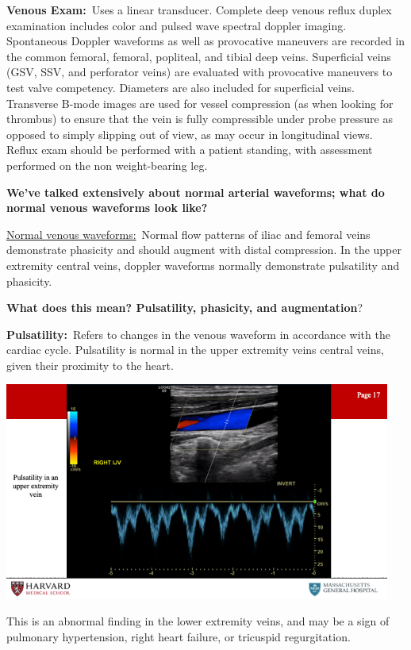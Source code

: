 \documentclass[
]{book}
\begin{document}
\textbf{Venous Exam:}~Uses a linear transducer. Complete deep venous reflux
duplex examination includes color and pulsed wave spectral doppler
imaging. Spontaneous Doppler waveforms as well as provocative maneuvers
are recorded in the common femoral, femoral, popliteal, and tibial deep
veins. Superficial veins (GSV, SSV, and perforator veins) are evaluated
with provocative maneuvers to test valve competency. Diameters are also
included for superficial veins. Transverse B-mode images are used for
vessel compression (as when looking for thrombus) to ensure that the
vein is fully compressible under probe pressure as opposed to simply
slipping out of view, as may occur in longitudinal views. Reflux exam
should be performed with a patient standing, with assessment performed
on the non weight-bearing leg.

\textbf{We've talked extensively about normal arterial waveforms; what do
normal venous waveforms look like?}

\underline{Normal venous waveforms:}~Normal flow patterns of iliac and
femoral veins demonstrate phasicity and should augment with distal
compression. In the upper extremity central veins, doppler waveforms
normally demonstrate pulsatility and phasicity.

\textbf{What does this mean? Pulsatility, phasicity, and augmentation}?

\textbf{Pulsatility:}~Refers to changes in the venous waveform in accordance
with the cardiac cycle. Pulsatility is normal in the upper extremity
veins central veins, given their proximity to the heart.

\includegraphics[width=5in]{images/vasc_lab/Slide18}

This is an abnormal finding in the lower extremity veins, and may be a
sign of pulmonary hypertension, right heart failure, or tricuspid
regurgitation.
\end{document}
